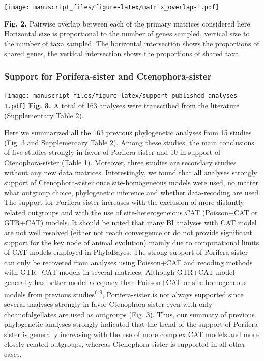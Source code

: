 \documentclass[]{article}
\begin{document}
\texttt{[image: manuscript\_files/figure-latex/matrix\_overlap-1.pdf]}

\textbf{Fig. 2.} Pairwise overlap between each of the primary matrices
considered here. Horizontal size is proportional to the number of genes
sampled, vertical size to the number of taxa sampled. The horizontal
intersection shows the proportions of shared genes, the vertical
intersection shows the proportions of shared taxa.

\hypertarget{support-for-porifera-sister-and-ctenophora-sister}{%
\subsubsection{Support for Porifera-sister and
Ctenophora-sister}\label{support-for-porifera-sister-and-ctenophora-sister}}

\texttt{[image: manuscript\_files/figure-latex/support\_published\_analyses-1.pdf]}
\textbf{Fig. 3.} A total of 163 analyses were transcribed from the
literature (Supplementary Table 2).

Here we summarized all the 163 previous phylogenetic analyses from 15
studies (Fig. 3 and Supplementary Table 2). Among these studies, the
main conclusions of five studies strongly in favor of Porifera-sister
and 10 in support of Ctenophora-sister (Table 1). Moreover, three
studies are secondary studies without any new data matrices.
Interestingly, we found that all analyses strongly support of
Ctenophora-sister once site-homogeneous models were used, no matter what
outgroup choice, phylogenetic inference and whether data-recoding are
used. The support for Porifera-sister increases with the exclusion of
more distantly related outgroups and with the use of site-heterogeneious
CAT (Poisson+CAT or GTR+CAT) models. It should be noted that many BI
analyses with CAT model are not well resolved (either not reach
convergence or do not provide significant support for the key node of
animal evolution) mainly due to computational limits of CAT models
employed in PhyloBayes. The strong support of Porifera-sister can only
be recovered from analyses using Poisson+CAT and recoding methods with
GTR+CAT models in several matrices. Although GTR+CAT model generally has
better model adequacy than Poisson+CAT or site-homogeneous models from
previous studies\textsuperscript{6,9}, Porifera-sister is not always
supported since several analyses strongly in favor Ctenophora-sister
even with only choanofalgellates are used as outgroups (Fig. 3). Thus,
our summary of previous phylogenetic analyses strongly indicated that
the trend of the support of Porifera-sister is generally increasing with
the use of more complex CAT models and more closely related outgroups,
whereas Ctenophora-sister is supported in all other cases.
\end{document}
